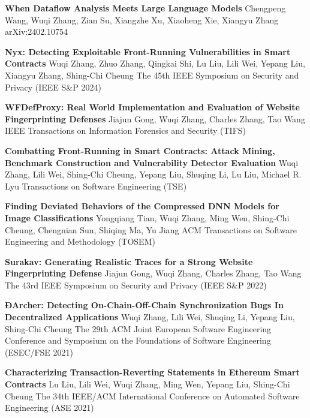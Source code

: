 %
%
%


\begin{scholarship}
	{\textbf{When Dataflow Analysis Meets Large Language Models}}
	{Chengpeng Wang, Wuqi Zhang, Zian Su, Xiangzhe Xu, Xiaoheng Xie, Xiangyu Zhang}
	\scholarshipentry{}
	{arXiv:2402.10754}

	{\textbf{Nyx: Detecting Exploitable Front-Running Vulnerabilities in Smart Contracts}}
	{Wuqi Zhang, Zhuo Zhang, Qingkai Shi, Lu Liu, Lili Wei, Yepang Liu, Xiangyu Zhang, Shing-Chi Cheung}
	\scholarshipentry{}
	{The 45th IEEE Symposium on Security and Privacy (IEEE S\&P 2024)}

	{\textbf{WFDefProxy: Real World Implementation and Evaluation of Website Fingerprinting Defenses}}
	{Jiajun Gong, Wuqi Zhang, Charles Zhang, Tao Wang}
	\scholarshipentry{}
	{IEEE Transactions on Information Forensics and Security (TIFS)}

	{\textbf{Combatting Front-Running in Smart Contracts: Attack Mining, Benchmark Construction and Vulnerability Detector Evaluation}}
	{Wuqi Zhang, Lili Wei, Shing-Chi Cheung, Yepang Liu, Shuqing Li, Lu Liu, Michael R. Lyu}
	\scholarshipentry{}
	{Transactions on Software Engineering (TSE)}

	{\textbf{Finding Deviated Behaviors of the Compressed DNN Models for Image Classifications}}
	{Yongqiang Tian, Wuqi Zhang, Ming Wen, Shing-Chi Cheung, Chengnian Sun, Shiqing Ma, Yu Jiang}
	\scholarshipentry{}
	{ACM Transactions on Software Engineering and Methodology (TOSEM)}

	{\textbf{Surakav: Generating Realistic Traces for a Strong Website Fingerprinting Defense}}
	{Jiajun Gong, Wuqi Zhang, Charles Zhang, Tao Wang}
	\scholarshipentry{}
	{The 43rd IEEE Symposium on Security and Privacy (IEEE S\&P 2022)}

	{\textbf{ÐArcher: Detecting On-Chain-Off-Chain Synchronization Bugs In Decentralized Applications}}
	{Wuqi Zhang, Lili Wei, Shuqing Li, Yepang Liu, Shing-Chi Cheung}
	\scholarshipentry{}
	{The 29th ACM Joint European Software Engineering Conference and Symposium on the Foundations of Software Engineering (ESEC/FSE 2021)}

	{\textbf{Characterizing Transaction-Reverting Statements in Ethereum Smart Contracts}}
	{Lu Liu, Lili Wei, Wuqi Zhang, Ming Wen, Yepang Liu, Shing-Chi Cheung}
	\scholarshipentry{}
	{The 34th IEEE/ACM International Conference on Automated Software Engineering (ASE 2021)}
\end{scholarship}
